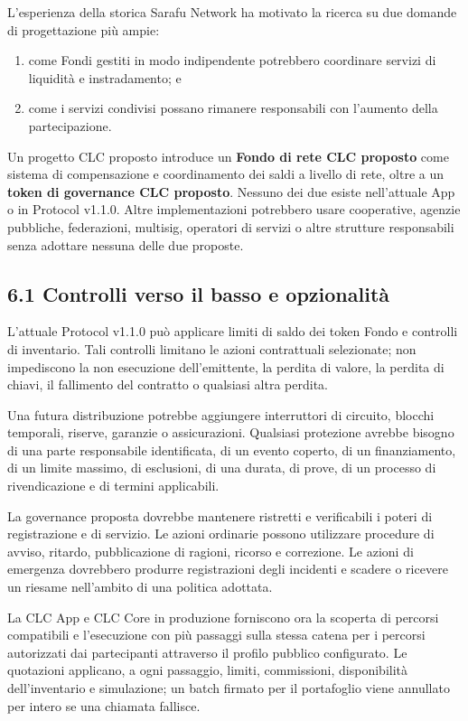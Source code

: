 \documentclass[11pt]{article}
\begin{document}
L'esperienza della storica Sarafu Network ha motivato la ricerca su due domande di progettazione più ampie:

\begin{enumerate}[leftmargin=*]
\item come Fondi gestiti in modo indipendente potrebbero coordinare servizi di liquidità e instradamento; e
\item come i servizi condivisi possano rimanere responsabili con l'aumento della partecipazione.
\end{enumerate}
Un progetto CLC proposto introduce un \textbf{Fondo di rete CLC proposto} come sistema di compensazione e coordinamento dei saldi a livello di rete, oltre a un \textbf{token di governance CLC proposto}. Nessuno dei due esiste nell'attuale App o in Protocol v1.1.0. Altre implementazioni potrebbero usare cooperative, agenzie pubbliche, federazioni, multisig, operatori di servizi o altre strutture responsabili senza adottare nessuna delle due proposte.

\subsection*{6.1 Controlli verso il basso e opzionalità}

L'attuale Protocol v1.1.0 può applicare limiti di saldo dei token Fondo e controlli di inventario. Tali controlli limitano le azioni contrattuali selezionate; non impediscono la non esecuzione dell'emittente, la perdita di valore, la perdita di chiavi, il fallimento del contratto o qualsiasi altra perdita.

Una futura distribuzione potrebbe aggiungere interruttori di circuito, blocchi temporali, riserve, garanzie o assicurazioni. Qualsiasi protezione avrebbe bisogno di una parte responsabile identificata, di un evento coperto, di un finanziamento, di un limite massimo, di esclusioni, di una durata, di prove, di un processo di rivendicazione e di termini applicabili.

La governance proposta dovrebbe mantenere ristretti e verificabili i poteri di registrazione e di servizio. Le azioni ordinarie possono utilizzare procedure di avviso, ritardo, pubblicazione di ragioni, ricorso e correzione. Le azioni di emergenza dovrebbero produrre registrazioni degli incidenti e scadere o ricevere un riesame nell'ambito di una politica adottata.

La CLC App e CLC Core in produzione forniscono ora la scoperta di percorsi compatibili e l'esecuzione con più passaggi sulla stessa catena per i percorsi autorizzati dai partecipanti attraverso il profilo pubblico configurato. Le quotazioni applicano, a ogni passaggio, limiti, commissioni, disponibilità dell'inventario e simulazione; un batch firmato per il portafoglio viene annullato per intero se una chiamata fallisce.
\end{document}
